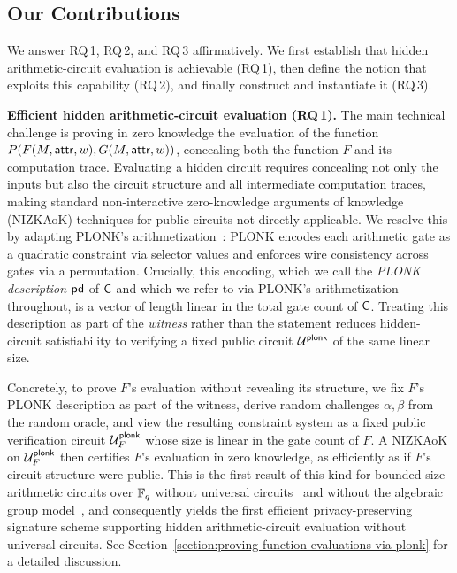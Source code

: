 \subsection{Our Contributions}\label{subsection:introduction-contributions}
We answer RQ\,1, RQ\,2, and RQ\,3 affirmatively.
We first establish that hidden arithmetic-circuit evaluation is achievable (RQ\,1),
then define the notion that exploits this capability (RQ\,2),
and finally construct and instantiate it (RQ\,3).

\medskip
\noindent\textbf{Efficient hidden arithmetic-circuit evaluation (RQ\,1).}
The main technical challenge is proving in zero knowledge the evaluation of the function
$P(F(M, \mathsf{attr}, w), G(M, \mathsf{attr}, w))$, concealing both the function $F$ and its computation trace.
Evaluating a hidden circuit requires concealing
not only the inputs but also the circuit structure and all intermediate computation traces,
making standard non-interactive zero-knowledge arguments of knowledge (NIZKAoK) techniques for public circuits not directly applicable.
We resolve this by adapting PLONK's arithmetization~\cite{EPRINT:GabWilCio19}:
PLONK encodes each arithmetic gate as a quadratic constraint via selector values
and enforces wire consistency across gates via a permutation.
Crucially, this encoding, which we call the \emph{PLONK description} $\mathsf{pd}$ of $\mathsf{C}$
and which we refer to via PLONK's arithmetization throughout,
is a vector of length linear in the total gate count of $\mathsf{C}$.
Treating this description as part of the \emph{witness} rather than the statement
reduces hidden-circuit satisfiability to verifying a fixed public circuit $\mathcal{U}^\mathsf{plonk}$
of the same linear size.

Concretely, to prove $F$'s evaluation without revealing its structure,
we fix $F$'s PLONK description as part of the witness,
derive random challenges $\alpha, \beta$ from the random oracle,
and view the resulting constraint system as a fixed public verification circuit
$\mathcal{U}^\mathsf{plonk}_F$ whose size is linear in the gate count of $F$.
A NIZKAoK on $\mathcal{U}^\mathsf{plonk}_F$ then certifies $F$'s evaluation in zero knowledge,
as efficiently as if $F$'s circuit structure were public.
This is the first result of this kind for bounded-size arithmetic circuits over $\mathbb{F}_q$
without universal circuits~\cite{STOC:Valiant76}
and without the algebraic group model~\cite{CRYPTO:FucKilLos18},
and consequently yields the first efficient privacy-preserving signature scheme
supporting hidden arithmetic-circuit evaluation without universal circuits.
See Section~\ref{section:proving-function-evaluations-via-plonk} for a detailed discussion.

